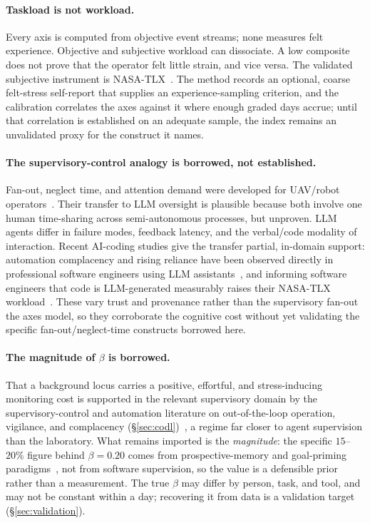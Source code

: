 \documentclass[10pt,twocolumn]{article}
\begin{document}
\paragraph{Taskload is not workload.} Every axis is computed from objective event
streams; none measures felt experience. Objective and subjective workload can
dissociate. A low composite does not prove that the operator felt little strain,
and vice versa. The validated
subjective instrument is NASA-TLX~\cite{hart1988}. The method records an
optional, coarse felt-stress self-report that supplies an experience-sampling
criterion, and the calibration correlates the axes against it where enough
graded days accrue; until that correlation is established on an adequate sample,
the index remains an unvalidated proxy for the construct it names.

\paragraph{The supervisory-control analogy is borrowed, not established.}
Fan-out, neglect time, and attention demand were developed for UAV/robot
operators~\cite{cummings2008,crandall2007}. Their transfer to LLM oversight is
plausible because both involve one human time-sharing across semi-autonomous
processes, but unproven. LLM agents differ in failure modes, feedback latency,
and the verbal/code modality of interaction. Recent AI-coding studies give the
transfer partial, in-domain support: automation complacency and rising reliance
have been observed directly in professional software engineers using LLM
assistants~\cite{qian2024}, and informing software engineers that code is LLM-generated
measurably raises their NASA-TLX workload~\cite{tang2024}. These vary trust and
provenance rather than the supervisory fan-out the axes model, so they
corroborate the cognitive cost without yet validating the specific
fan-out/neglect-time constructs borrowed here.

\paragraph{The magnitude of $\beta$ is borrowed.} That a background locus
carries a positive, effortful, and
stress-inducing monitoring cost is supported in the relevant supervisory domain by the
supervisory-control and automation literature on out-of-the-loop operation,
vigilance, and complacency (\S\ref{sec:codl})~\cite{endsley1995,warm2008,parasuraman2010,eriksson2017}, a
regime far closer to agent supervision than the laboratory. What remains imported
is the \emph{magnitude}: the specific $15$--$20\%$ figure behind $\beta=0.20$
comes from prospective-memory and goal-priming
paradigms~\cite{smith2003,masicampo2011}, not from software supervision, so the
value is a defensible prior rather than a measurement. The true $\beta$ may differ
by person, task, and tool, and may not be constant within a day; recovering it
from data is a validation target (\S\ref{sec:validation}).
\end{document}
